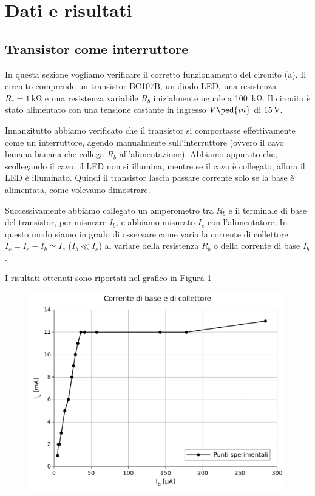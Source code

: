 \section*{Dati e risultati}

\subsection*{Transistor come interruttore}

In questa sezione vogliamo verificare il corretto funzionamento del circuito (a).
Il circuito comprende un transistor BC107B, un diodo LED, una resistenza $R_c=1\,\si{\kilo\ohm}$ e una resistenza variabile $R_b$ inizialmente uguale a \SI{100}{\kilo\ohm}. Il circuito è stato alimentato con una tensione costante in ingresso $V\ped{in}$ di $15\,\si{\volt}$.

Innanzitutto abbiamo verificato che il transistor si comportasse effettivamente come un interruttore, agendo manualmente sull'interruttore (ovvero il cavo banana-banana che collega $R_b$ all'alimentazione). Abbiamo appurato che, scollegando il cavo, il LED non si illumina, mentre se il cavo è collegato, allora il LED è illuminato. Quindi il transistor lascia passare corrente solo se la base è alimentata, come volevamo dimostrare.

Successivamente abbiamo collegato un amperometro tra $R_b$ e il terminale di base del transistor, per misurare $I_b$, e abbiamo misurato $I_e$ con l'alimentatore. In questo modo siamo in grado di osservare come varia la corrente di collettore $I_c = I_e - I_b \simeq I_e$ ($I_b \ll I_e$) al variare della resistenza $R_b$ o della corrente di base $I_b$.

I risultati ottenuti sono riportati nel grafico in Figura \ref{fig:a}

\begin{figure}
    \includegraphics[scale=0.65]{a.pdf}
    \caption{}
    \label{fig:a}
\end{figure}

